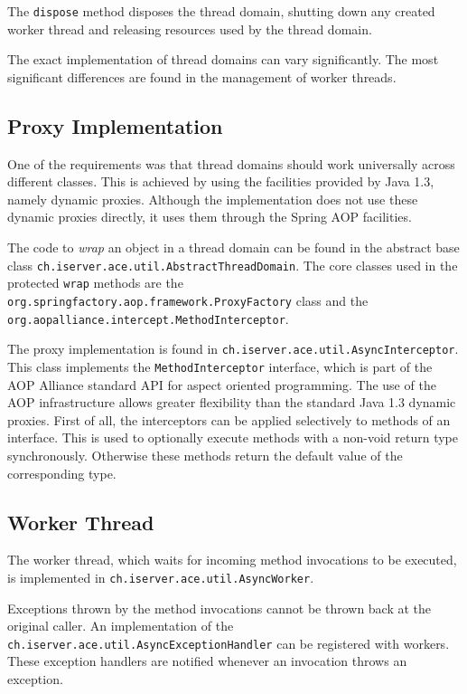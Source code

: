 The \texttt{dispose} method disposes the thread domain, shutting down 
any created worker thread and releasing resources used by the thread domain.

The exact implementation of thread domains can vary significantly. The most 
significant differences are found in the management of worker threads.


\subsection{Proxy Implementation}
One of the requirements was that thread domains should work universally across
different classes. This is achieved by using the facilities provided by
Java 1.3, namely dynamic proxies. Although the implementation does not use
these dynamic proxies directly, it uses them through the Spring AOP facilities.

The code to \emph{wrap} an object in a thread domain can be found in the
abstract base class \texttt{ch.iserver.ace.util.AbstractThreadDomain}. The
core classes used in the protected \texttt{wrap} methods are the
\texttt{org.springfactory.aop.framework.ProxyFactory} class and the 
\texttt{org.aopalliance.intercept.MethodInterceptor}. 

The proxy implementation is found in 
\texttt{ch.iserver.ace.util.AsyncInterceptor}. This class implements the
\texttt{MethodInterceptor} interface, which is part of the AOP Alliance
standard API for aspect oriented programming. The use of the AOP 
infrastructure allows greater flexibility than the standard Java 1.3 dynamic
proxies. First of all, the interceptors can be applied selectively to
methods of an interface. This is used to optionally execute methods with 
a non-void return type synchronously. Otherwise these methods return
the default value of the corresponding type.


\subsection{Worker Thread}
The worker thread, which waits for incoming method invocations to be
executed, is implemented in \texttt{ch.iserver.ace.util.AsyncWorker}.

Exceptions thrown by the method invocations cannot be thrown back at the
original caller. An implementation of the 
\texttt{ch.iserver.ace.util.AsyncExceptionHandler} can be registered with
workers. These exception handlers are notified whenever an invocation
throws an exception.


